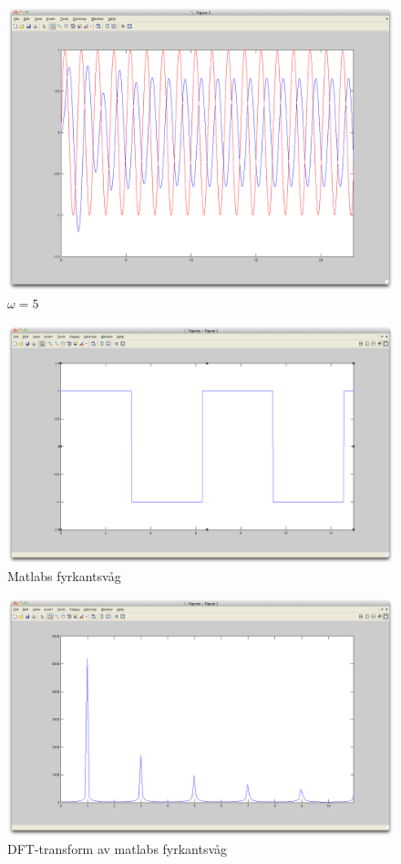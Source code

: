 \documentclass[]{article}
\begin{document}
\begin{figure}[hbt]
  \centering
  \includegraphics[width=15.0cm]{omega 5.png}
  \caption{$\omega = 5$}
\end{figure}
\begin{figure}[hbt]
  \centering
  \includegraphics[width=15.0cm]{matlabsquare.png}
  \caption{Matlabs fyrkantsvåg}
\end{figure}
\begin{figure}[hbt]
  \centering
  \includegraphics[width=15.0cm]{matlabsquaredft.png}
  \caption{DFT-transform av matlabs fyrkantsvåg}
\end{figure}
\end{document}
